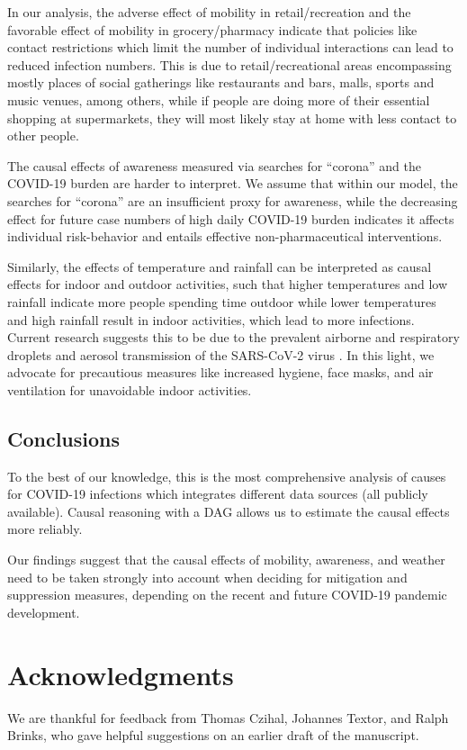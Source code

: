 \documentclass[]{elsarticle} %
\begin{document}
In our analysis, the adverse effect of mobility in retail/recreation and the favorable effect of mobility in grocery/pharmacy indicate that policies like contact restrictions which limit the number of individual interactions can lead to reduced infection numbers. This is due to retail/recreational areas encompassing mostly places of social gatherings like restaurants and bars, malls, sports and music venues, among others, while if people are doing more of their essential shopping at supermarkets, they will most likely stay at home with less contact to other people.

The causal effects of awareness measured via searches for ``corona'' and the COVID-19 burden are harder to interpret. We assume that within our model, the searches for ``corona'' are an insufficient proxy for awareness, while the decreasing effect for future case numbers of high daily COVID-19 burden indicates it affects individual risk-behavior and entails effective non-pharmaceutical interventions.

Similarly, the effects of temperature and rainfall can be interpreted as causal effects for indoor and outdoor activities, such that higher temperatures and low rainfall indicate more people spending time outdoor while lower temperatures and high rainfall result in indoor activities, which lead to more infections. Current research suggests this to be due to the prevalent airborne and respiratory droplets and aerosol transmission of the SARS-CoV-2 virus \citep{world2020transmission}. In this light, we advocate for precautious measures like increased hygiene, face masks, and air ventilation for unavoidable indoor activities.

\hypertarget{conclusions}{%
\subsection{Conclusions}\label{conclusions}}

To the best of our knowledge, this is the most comprehensive analysis of causes for COVID-19 infections which integrates different data sources (all publicly available). Causal reasoning with a DAG allows us to estimate the causal effects more reliably.

Our findings suggest that the causal effects of mobility, awareness, and weather need to be taken strongly into account when deciding for mitigation and suppression measures, depending on the recent and future COVID-19 pandemic development.

\hypertarget{acknowledgments}{%
\section*{Acknowledgments}\label{acknowledgments}}

We are thankful for feedback from Thomas Czihal, Johannes Textor, and Ralph Brinks, who gave helpful suggestions on an earlier draft of the manuscript.

\renewcommand\refname{References}

\end{document}
